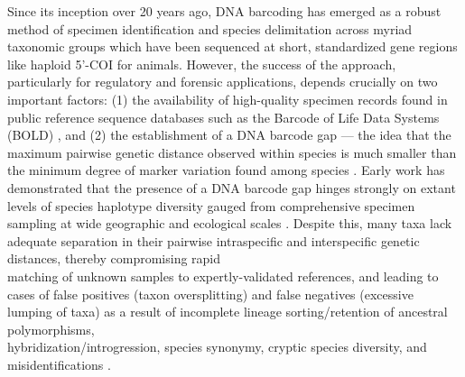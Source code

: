 \documentclass[12pt]{article}
\begin{document}
Since its inception over 20 years ago, DNA barcoding \citep{hebert2003biological, hebert2003barcoding} has emerged as a robust method of specimen identification and species delimitation across myriad \\ taxonomic groups which have been sequenced at short, standardized gene regions like haploid 5'-COI for animals. However, the success of the approach, particularly for regulatory and forensic applications, depends crucially on two important factors: (1) the availability of high-quality specimen records found in public reference sequence databases such as the Barcode of Life Data Systems (BOLD) \citep{ratnasingham2007bold}, and (2) the establishment of a DNA barcode gap --- the idea that the maximum pairwise genetic distance observed within species is much smaller than the minimum degree of marker variation found among species \citep{meyer2005dna, meier2008use}. Early work has demonstrated that the presence of a DNA barcode gap hinges strongly on extant levels of species haplotype diversity gauged from comprehensive specimen sampling at wide geographic and ecological scales \citep{bergsten2012effect}. Despite this, many taxa lack adequate separation in their pairwise intraspecific and interspecific genetic distances, thereby compromising rapid \\ matching of unknown samples to expertly-validated references, and leading to cases of false positives (taxon oversplitting) and false negatives (excessive lumping of taxa) as a result of incomplete lineage sorting/retention of ancestral polymorphisms, \\ hybridization/introgression, species synonymy, cryptic species diversity, and \\ misidentifications \citep{hubert2015dna, phillips2022lack}.
\end{document}

